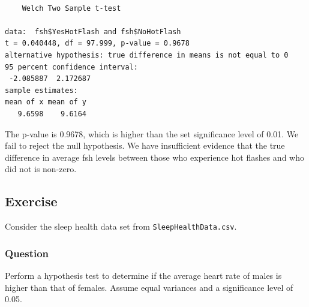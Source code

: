 \documentclass[
  letterpaper,
  DIV=11,
  numbers=noendperiod]{scrartcl}
\newenvironment{Shaded}{\begin{snugshade}}{\end{snugshade}}
\newcommand{\AttributeTok}[1]{\textcolor[rgb]{0.40,0.45,0.13}{#1}}
\newcommand{\CommentTok}[1]{\textcolor[rgb]{0.37,0.37,0.37}{#1}}
\newcommand{\ConstantTok}[1]{\textcolor[rgb]{0.56,0.35,0.01}{#1}}
\newcommand{\DecValTok}[1]{\textcolor[rgb]{0.68,0.00,0.00}{#1}}
\newcommand{\FunctionTok}[1]{\textcolor[rgb]{0.28,0.35,0.67}{#1}}
\newcommand{\NormalTok}[1]{\textcolor[rgb]{0.00,0.23,0.31}{#1}}
\newcommand{\OtherTok}[1]{\textcolor[rgb]{0.00,0.23,0.31}{#1}}
\newcommand{\SpecialCharTok}[1]{\textcolor[rgb]{0.37,0.37,0.37}{#1}}
\newcommand{\StringTok}[1]{\textcolor[rgb]{0.13,0.47,0.30}{#1}}
\begin{document}
\begin{Shaded}
\end{Shaded}

\begin{verbatim}

    Welch Two Sample t-test

data:  fsh$YesHotFlash and fsh$NoHotFlash
t = 0.040448, df = 97.999, p-value = 0.9678
alternative hypothesis: true difference in means is not equal to 0
95 percent confidence interval:
 -2.085887  2.172687
sample estimates:
mean of x mean of y 
   9.6598    9.6164 
\end{verbatim}

The p-value is 0.9678, which is higher than the set significance level
of 0.01. We fail to reject the null hypothesis. We have insufficient
evidence that the true difference in average fsh levels between those
who experience hot flashes and who did not is non-zero.

\subsection{Exercise}\label{exercise-3}

Consider the sleep health data set from \texttt{SleepHealthData.csv}.

\subsubsection{Question}

Perform a hypothesis test to determine if the average heart rate of
males is higher than that of females. Assume equal variances and a
significance level of 0.05.
\end{document}
